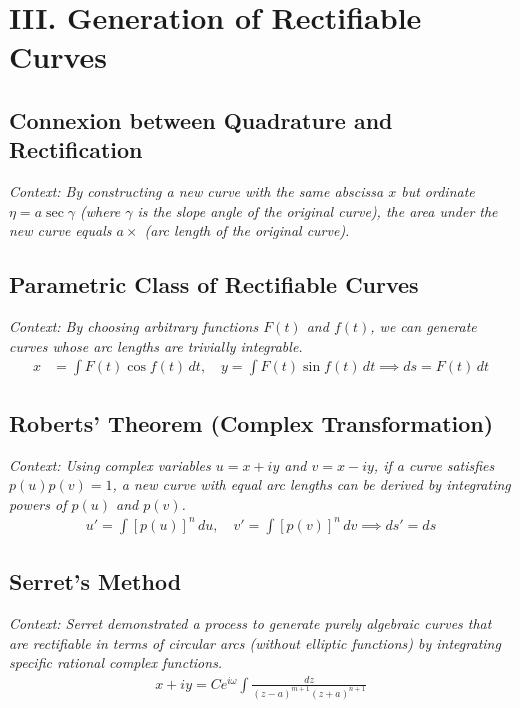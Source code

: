 \documentclass[11pt, a4paper]{article}
\begin{document}
\section*{\color{primary} III. Generation of Rectifiable Curves}

\subsection*{\color{secondary} Connexion between Quadrature and Rectification}
\textit{\small Context: By constructing a new curve with the same abscissa $x$ but ordinate $\eta = a \sec \gamma$ (where $\gamma$ is the slope angle of the original curve), the area under the new curve equals $a \times$ (arc length of the original curve).}

\subsection*{\color{secondary} Parametric Class of Rectifiable Curves}
\textit{\small Context: By choosing arbitrary functions $F(t)$ and $f(t)$, we can generate curves whose arc lengths are trivially integrable.}
\begin{align*}
    x &= \int F(t) \cos f(t) \, dt, \quad y = \int F(t) \sin f(t) \, dt \implies ds = F(t) \, dt
\end{align*}

\subsection*{\color{secondary} Roberts' Theorem (Complex Transformation)}
\textit{\small Context: Using complex variables $u = x+iy$ and $v = x-iy$, if a curve satisfies $p(u)p(v) = 1$, a new curve with equal arc lengths can be derived by integrating powers of $p(u)$ and $p(v)$.}
\begin{align*}
    u' = \int [p(u)]^n \, du, \quad v' = \int [p(v)]^n \, dv \implies ds' = ds
\end{align*}

\subsection*{\color{secondary} Serret's Method}
\textit{\small Context: Serret demonstrated a process to generate purely algebraic curves that are rectifiable in terms of circular arcs (without elliptic functions) by integrating specific rational complex functions.}
\begin{align*}
    x+iy = C e^{i\omega} \int \frac{dz}{(z-a)^{m+1}(z+a)^{n+1}}
\end{align*}
\end{document}
